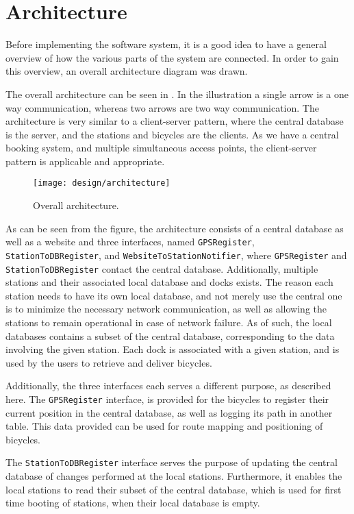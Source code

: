 \section{Architecture}\label{sec:architecture}
Before implementing the software system, it is a good idea to have a general overview of how the various parts of the system are connected.
In order to gain this overview, an overall architecture diagram was drawn.

The overall architecture can be seen in .
In the illustration a single arrow is a one way communication, whereas two arrows are two way communication.
The architecture is very similar to a client-server pattern, where the central database is the server, and the stations and bicycles are the clients.
As we have a central booking system, and multiple simultaneous access points, the client-server pattern is applicable and appropriate.

\begin{figure}[h]
	\centering
	\texttt{[image: design/architecture]}
	\caption{Overall architecture.}\label{fig:overallarch}
\end{figure}

As can be seen from the figure, the architecture consists of a central database as well as a website and three interfaces, named \texttt{GPSRegister}, \texttt{StationToDBRegister}, and \texttt{WebsiteTo\-StationNotifier}, where \texttt{GPS\-Register} and \texttt{StationToDBRegister} contact the central database.
Additionally, multiple stations and their associated local database and docks exists.
The reason each station needs to have its own local database, and not merely use the central one is to minimize the necessary network communication, as well as allowing the stations to remain operational in case of network failure.
As of such, the local databases contains a subset of the central database, corresponding to the data involving the given station.
Each dock is associated with a given station, and is used by the users to retrieve and deliver bicycles.

Additionally, the three interfaces each serves a different purpose, as described here.
The \texttt{GPS\-Register} interface, is provided for the bicycles to register their current position in the central database, as well as logging its path in another table.
This data provided can be used for route mapping and positioning of bicycles.

The \texttt{StationToDBRegister} interface serves the purpose of updating the central database of changes performed at the local stations. Furthermore, it enables the local stations to read their subset of the central database, which is used for first time booting of stations, when their local database is empty.

